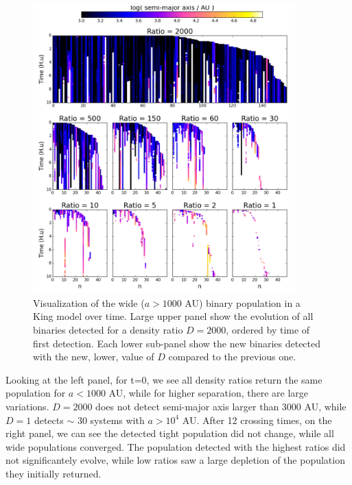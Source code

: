 \begin{figure}
\begin{center}
\includegraphics[width=0.9\textwidth]{Figures/5_flickering}
\caption{Visualization of the wide ($a>1000$ AU) binary population in a King model over time. Large upper panel show the evolution of all binaries detected for a density ratio $D=2000$, ordered by time of first detection. Each lower sub-panel show the new binaries detected with the new, lower, value of $D$ compared to the previous one.}
\label{Fig:5_flickering}
\end{center}
\end{figure}

Looking at the left panel, for t=0, we see all density ratios return the same population for $a < 1000$ AU, while for higher separation, there are large variations. $D = 2000$ does not detect semi-major axis larger than 3000 AU, while $D = 1$ detects $\sim$ 30 systems with $a > 10^4$ AU. After 12 crossing times, on the right panel, we can see the detected tight population did not change, while all wide populations converged. The population detected with the highest ratios did not significantely evolve, while low ratios saw a large depletion of the population they initially returned. 

